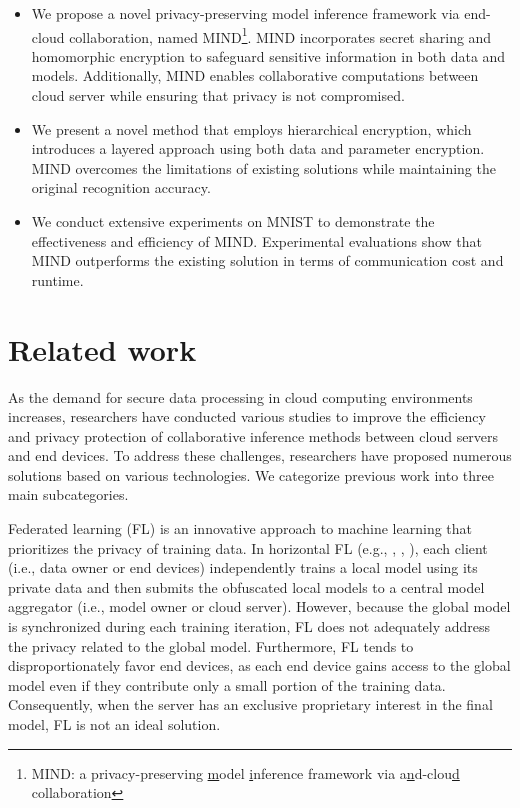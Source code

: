 \documentclass[conference]{IEEEtran}
\begin{document}
\begin{itemize}
    \item We propose a novel privacy-preserving model inference framework via end-cloud collaboration, named MIND\footnote{MIND: a privacy-preserving \underline{m}odel \underline{i}nference framework via a\underline{n}d-clou\underline{d} collaboration}. MIND incorporates secret sharing and homomorphic encryption to safeguard sensitive information in both data and models. Additionally, MIND enables collaborative computations between cloud server while ensuring that privacy is not compromised.
    
    \item We present a novel method that employs hierarchical encryption, which introduces a layered approach using both data and parameter encryption. MIND overcomes the limitations of existing solutions while maintaining the original recognition accuracy.
    
    \item We conduct extensive experiments on MNIST to demonstrate the effectiveness and efficiency of MIND. Experimental evaluations show that MIND outperforms the existing solution in terms of communication cost and runtime.  
\end{itemize}
\section{Related work}
As the demand for secure data processing in cloud computing environments increases, researchers have conducted various studies to improve the efficiency and privacy protection of collaborative inference methods between cloud servers and end devices. To address these challenges, researchers have proposed numerous solutions based on various technologies. We categorize previous work into three main subcategories.

Federated learning (FL) is an innovative approach to machine learning that prioritizes the privacy of training data. In horizontal FL (e.g., \cite{pmlr-v54-mcmahan17a}, \cite{Gupta2018DistributedLO}, \cite{9252066}), each client (i.e., data owner or end devices) independently trains a local model using its private data and then submits the obfuscated local models to a central model aggregator (i.e., model owner or cloud server). However, because the global model is synchronized during each training iteration, FL does not adequately address the privacy related to the global model. Furthermore, FL tends to disproportionately favor end devices, as each end device gains access to the global model even if they contribute only a small portion of the training data. Consequently, when the server has an exclusive proprietary interest in the final model, FL is not an ideal solution.
\end{document}
